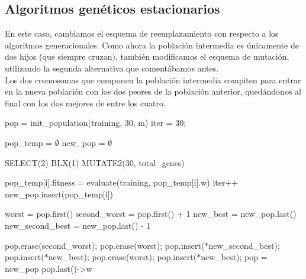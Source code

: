 \documentclass[12pt]{article}
\begin{document}
\subsection*{Algoritmos genéticos estacionarios}
\label{age}

En este caso, cambiamos el esquema de reemplazamiento con respecto a los algoritmos generacionales. Como ahora la población intermedia es únicamente de dos hijos (que siempre cruzan), también modificamos el esquema de mutación, utilizando la segunda alternativa que comentábamos antes.\\

Los dos cromosomas que componen la población intermedia compiten para entrar en la nueva población con los dos peores de la población anterior, quedándonos al final con los dos mejores de entre los cuatro.

\begin{algorithm}[h]
\begin{algorithmic}

    \State pop = init\_population(training, 30, m) 
    \State iter = 30;

        \State pop\_temp = $\emptyset$  
        \State new\_pop = $\emptyset$   

        \State SELECT(2) 
        \State BLX(1)  
        \State MUTATE2(30, total\_genes)

          
            \State pop\_temp[i].fitness = evaluate(training, pop\_temp[i].w)
            \State iter++
            \State new\_pop.insert(pop\_temp[i])
        \EndFor
        
        \State worst = pop.first()
        \State second\_worst = pop.first() + 1
        \State new\_best = new\_pop.last()
        \State new\_second\_best = new\_pop.last() - 1

         
          \State pop.erase(second\_worst);
          \State pop.erase(worst);
          \State pop.insert($\ast$new\_second\_best);
          \State pop.insert($\ast$new\_best);
         
          \State pop.erase(worst);
          \State pop.insert($\ast$new\_best);
        \EndIf
        \State pop = new\_pop 
    \EndWhile
    \State \Return pop.last()->w
\EndFunction
  
\end{algorithmic}
\end{algorithm}
\end{document}

